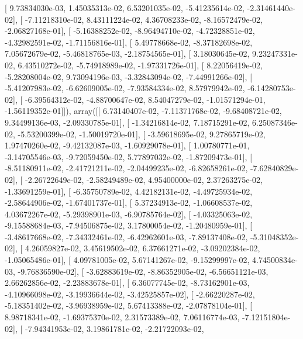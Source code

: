 \documentclass{article}
\begin{document}
       [  9.73834030e-03,   1.45035313e-02,   6.53201035e-02,
         -5.41235614e-02,  -2.31461440e-02],
       [ -7.11218310e-02,   8.43111224e-02,   4.36708233e-02,
         -8.16572479e-02,  -2.06827168e-01],
       [ -5.16388252e-02,  -8.96494710e-02,  -4.72328851e-02,
         -4.32982591e-02,  -1.71156816e-01],
       [  5.49778668e-02,  -8.37182698e-02,   7.05672679e-02,
         -5.46818765e-03,  -2.18754565e-01],
       [  3.18030645e-02,   9.23247331e-02,   6.43510272e-02,
         -5.74918989e-02,  -1.97331726e-01],
       [  8.22056419e-02,  -5.28208004e-02,   9.73094196e-03,
         -3.32843094e-02,  -7.44991266e-02],
       [ -5.41207983e-02,  -6.62609005e-02,  -7.93584334e-02,
          8.57979942e-02,  -6.14280753e-02],
       [ -6.39564312e-02,  -4.88700647e-02,   8.54047279e-02,
         -1.01571294e-01,  -1.56119352e-01]]), array([[  6.73140407e-02,  -7.11371768e-02,  -9.68408721e-02,
          9.34499136e-03,  -2.09330785e-01],
       [ -1.34216814e-02,   7.18715291e-02,   6.25087346e-02,
         -5.53200399e-02,  -1.50019720e-01],
       [ -3.59618695e-02,   9.27865719e-02,   1.97470260e-02,
         -9.42132087e-03,  -1.60929078e-01],
       [  1.00780771e-01,  -3.14705546e-03,  -9.72059450e-02,
          5.77897032e-02,  -1.87209473e-01],
       [ -8.51180911e-02,  -2.41721211e-02,  -2.04499235e-02,
         -6.82658261e-02,  -7.62840829e-02],
       [ -2.26722649e-02,  -2.58249489e-02,   4.95400000e-02,
          2.37263275e-02,  -1.33691259e-01],
       [ -6.35750789e-02,   4.42182131e-02,  -4.49725934e-02,
         -2.58644906e-02,  -1.67401737e-01],
       [  5.37234913e-02,  -1.06608537e-02,   4.03672267e-02,
         -5.29398901e-03,  -6.90785764e-02],
       [ -4.03325063e-02,  -9.15588684e-03,  -7.94506875e-02,
          3.17800054e-02,  -1.20480959e-01],
       [ -3.48617668e-02,  -7.34332461e-02,  -6.42962601e-03,
         -7.89137408e-02,  -5.31048352e-02],
       [  4.26059827e-02,   3.45619502e-02,   6.37661271e-02,
         -3.09202384e-02,  -1.05065486e-01],
       [  4.09781005e-02,   5.67141267e-02,  -9.15299997e-02,
          4.74500834e-03,  -9.76836590e-02],
       [ -3.62883619e-02,  -8.86352905e-02,  -6.56651121e-03,
          2.66262856e-02,  -2.23883678e-01],
       [  6.36077745e-02,  -8.73162901e-03,  -4.10966098e-02,
         -3.19936644e-02,  -3.42525857e-02],
       [ -2.66220287e-02,  -5.18351402e-02,  -3.96938959e-02,
          5.67413388e-02,  -2.07878104e-01],
       [  8.98718341e-02,  -1.69375370e-02,   2.31573389e-02,
          7.06116774e-03,  -7.12151804e-02],
       [ -7.94341953e-02,   3.19861781e-02,  -2.21722093e-02,
\end{document}
